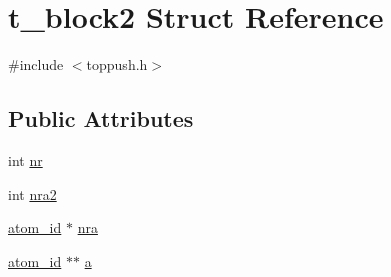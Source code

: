\hypertarget{structt__block2}{\section{t\-\_\-block2 \-Struct \-Reference}
\label{structt__block2}
}


{\ttfamily \#include $<$toppush.\-h$>$}

\subsection*{\-Public \-Attributes}
\begin{DoxyCompactItemize}
\item 
int \hyperlink{structt__block2_a7494043acbaf5e286eaad414bc2668eb}{nr}
\item 
int \hyperlink{structt__block2_a4fb36e4a16aec69e9ca40d8d7f24cf18}{nra2}
\item 
\hyperlink{include_2types_2simple_8h_ad3f47cdb48677e516e2049719612c737}{atom\-\_\-id} $\ast$ \hyperlink{structt__block2_aa721715b8e386b4da2def388ffdecf4a}{nra}
\item 
\hyperlink{include_2types_2simple_8h_ad3f47cdb48677e516e2049719612c737}{atom\-\_\-id} $\ast$$\ast$ \hyperlink{structt__block2_a5b5950b2112bc7778dd8b979c961cee2}{a}
\end{DoxyCompactItemize}


